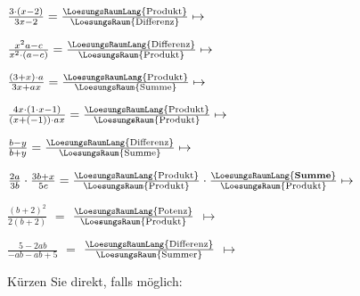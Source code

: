 \begin{bbwAufgabenBlock}




\item  $\frac{3\cdot{}(x-2)}{3x-2}
= \frac{\LoesungsRaumLang{\textrm{Produkt}}}{\LoesungsRaum{\textrm{Differenz}}} \mapsto
$ 

\item  $\frac{x^2a-c}{x^2\cdot{}(a-c)} = \frac{\LoesungsRaumLang{\textrm{Differenz}}}{\LoesungsRaum{\textrm{Produkt}}} \mapsto $ 

\item  $\frac{(3+x)\cdot{}a}{3x+ax} = \frac{\LoesungsRaumLang{\textrm{Produkt}}}{\LoesungsRaum{\textrm{Summe}}} \mapsto $ 

\item $\frac{4x\cdot{}(1\cdot{}x-1)}{(x+(-1))\cdot{}ax} = \frac{\LoesungsRaumLang{\textrm{Produkt}}}{\LoesungsRaum{\textrm{Produkt}}} \mapsto $ 

\item  $\frac{b-y}{b+y} = \frac{\LoesungsRaumLang{\textrm{Differenz}}}{\LoesungsRaum{\textrm{Summe}}} \mapsto $ 

\item  $\frac{2a}{3b}\cdot{}\frac{3b+x}{5c}
= \frac{\LoesungsRaumLang{\textrm{Produkt}}}{\LoesungsRaum{\textrm{Produkt}}} \cdot{} \frac{\LoesungsRaumLang{\textrm{\textbf{Summe}}}}{\LoesungsRaum{\textrm{Produkt}}}  \mapsto $ 

\item  $\frac{(b+2)^2}{2(b+2)}$ $=$ $\frac{\LoesungsRaumLang{\textrm{Potenz}}}{\LoesungsRaum{\textrm{Produkt}}}$
$\mapsto$  


\item  $\frac{5-2ab}{-ab-ab+5}$ $=$ $\frac{\LoesungsRaumLang{\textrm{Differenz}}}{\LoesungsRaum{\textrm{Summer}}}$
$\mapsto$ 

\end{bbwAufgabenBlock}


\platzFuerBerechnungenBisEndeSeite{}
\TRAINER{\newpage}

Kürzen Sie direkt, falls möglich:

